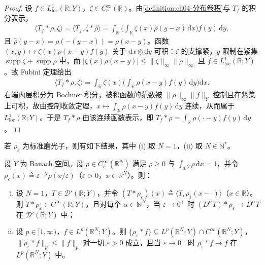 \documentclass[../../main.tex]{subfiles}%
\begin{document}
\begin{proof}
设 $f\in L^1_{\mathrm{loc}}(\mathbb{R};Y)$，$\zeta\in C_c^\infty(\mathbb{R})$。由\cref{definition:ch04-分布卷积}与 $T_f$ 的积分表示，
\begin{align*}
\langle T_f*\rho,\zeta\rangle=\langle T_f,\zeta*\hat\rho\rangle=\int_{\mathbb{R}}\Big(\int_{\mathbb{R}}\zeta(x)\hat\rho(y-x)\,\mathrm{d}x\Big)f(y)\,\mathrm{d}y,
\end{align*}
且 $\hat\rho(y-x)=\rho(-(y-x))=\rho(x-y)$。函数 $(x,y)\mapsto\zeta(x)\rho(x-y)f(y)$ 关于 $\mathrm{d}x\otimes\mathrm{d}y$ 可积：$\zeta$ 的支撑紧，$y$ 限制在紧集 $\operatorname{supp}\zeta+\operatorname{supp}\rho$ 中，而 $|\zeta(x)\rho(x-y)|\leqslant\|\zeta\|_\infty\|\rho\|_\infty$ 且 $f\in L^1_{\mathrm{loc}}(\mathbb{R};Y)$。故 Fubini 定理给出
\begin{align*}
\langle T_f*\rho,\zeta\rangle=\int_{\mathbb{R}}\zeta(x)\Big(\int_{\mathbb{R}}\rho(x-y)f(y)\,\mathrm{d}y\Big)\mathrm{d}x .
\end{align*}
右端内层积分为 Bochner 积分，被积函数的范数被 $\|\rho\|_\infty\|f\|_Y$ 控制且在紧集上可积，故由控制收敛定理，$x\mapsto\int_{\mathbb{R}}\rho(x-y)f(y)\,\mathrm{d}y$ 连续，从而属于 $L^1_{\mathrm{loc}}(\mathbb{R};Y)$。于是 $T_f*\rho$ 由该连续函数表示，即 $T_f*\rho=\int_{\mathbb{R}}\rho(\cdot-y)f(y)\,\mathrm{d}y$。
\end{proof}

若 $\rho_\varepsilon$ 为标准磨光子，则有如下结果，其中 (i) 取 $N=1$，(ii) 取 $N\in\mathbb{N}^*$。

\begin{proposition}\label{proposition:ch04-磨光逼近}
设 $Y$ 为 Banach 空间。设 $\rho\in C_c^\infty(\mathbb{R}^N)$ 满足 $\rho\geqslant0$ 与 $\int_{\mathbb{R}^N}\rho\,\mathrm{d}x=1$，并令 $\rho_\varepsilon(x)\triangleq\varepsilon^{-N}\rho(x/\varepsilon)$（$\varepsilon>0$，$x\in\mathbb{R}^N$）。则：
\begin{enumerate}[(i)]
\item\label{item:ch04-磨光逼近-i} 设 $N=1$，$T\in\mathcal{D}'(\mathbb{R};Y)$，并令 $(T*\rho_\varepsilon)(x)\triangleq\langle T,\rho_\varepsilon(x-\cdot)\rangle$（$x\in\mathbb{R}$）。则 $T*\rho_\varepsilon\in C^\infty(\mathbb{R};Y)$，且对每个 $\alpha\in\mathbb{N}^N$，当 $\varepsilon\to0^+$ 时 $(D^\alpha T)*\rho_\varepsilon\to D^\alpha T$ 在 $\mathcal{D}'(\mathbb{R};Y)$ 中；
\item\label{item:ch04-磨光逼近-ii} 设 $p\in[1,\infty)$，$f\in L^p(\mathbb{R}^N;Y)$。则 $\{\rho_\varepsilon*f\}\subseteq L^p(\mathbb{R}^N;Y)\cap C^\infty(\mathbb{R}^N;Y)$，$\|\rho_\varepsilon*f\|_p\leqslant\|f\|_p$ 对一切 $\varepsilon>0$ 成立，且当 $\varepsilon\to0^+$ 时 $\rho_\varepsilon*f\to f$ 在 $L^p(\mathbb{R}^N;Y)$ 中。
\end{enumerate}
\end{proposition}
\end{document}
